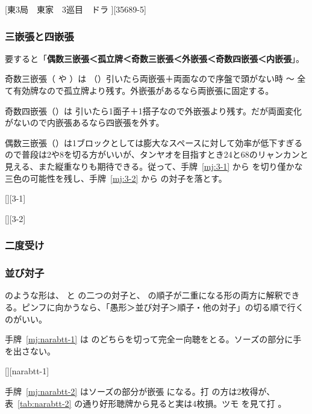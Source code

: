 \documentclass[../nankiru_main.tex]{subfiles}
\begin{document}
[東3局　東家　3巡目　ドラ ][35689-5]

\subsubsection{三嵌張と四嵌張}

要すると「\textbf{偶数三嵌張＜孤立牌＜奇数三嵌張＜外嵌張＜奇数四嵌張＜内嵌張}」\citep{chirno-kanchan}。

奇数三嵌張（ や ）は （）引いたら両嵌張＋両面なので序盤で頭がない時 〜 全て有効牌なので孤立牌より残す。外嵌張があるなら両嵌張に固定する。

奇数四嵌張（）は  引いたら1面子＋1搭子なので外嵌張より残す。だが両面変化がないので内嵌張あるなら四嵌張を外す。

偶数三嵌張（）は1ブロックとしては膨大なスペースに対して効率が低下すぎるので普段は2や8を切る方がいいが、タンヤオを目指すとき24と68のリャンカンと見える、また縦重なりも期待できる。従って、手牌~\ref{mj:3-1} から  を切り僅かな三色の可能性を残し、手牌~\ref{mj:3-2} から  の対子を落とす\citep{yuusee-2468}。

[][3-1]

[][3-2]


\subsubsection{二度受け}

\subsubsection*{並び対子}

 のような形は、 と  の二つの対子と、 の順子が二重になる形の両方に解釈できる。ピンフに向かうなら、「愚形＞並び対子＞順子・他の対子」の切る順で行くのがいい。

手牌~\ref{mj:narabtt-1} は  のどちらを切って完全ー向聴をとる。ソーズの部分に手を出さない\citep[][pp. 112--113]{uzaku-haikouritsu}。

[][narabtt-1]

手牌~\ref{mj:narabtt-2} はソーズの部分が嵌張  になる。打  の方は2枚得が、表~\ref{tab:narabtt-2} の通り好形聴牌から見ると実は4枚損。ツモ  を見て打 。
\end{document}
